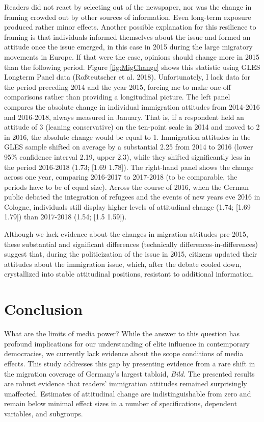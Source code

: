 \documentclass[
  12pt,
]{article}
\begin{document}
Readers did not react by selecting out of the newspaper, nor was the change in framing crowded out by other sources of information. Even long-term exposure produced rather minor effects. Another possible explanation for this resilience to framing is that individuals informed themselves about the issue and formed an attitude once the issue emerged, in this case in 2015 during the large migratory movements in Europe. If that were the case, opinions should change more in 2015 than the following period. Figure \ref{fig:MigChange} shows this statistic using GLES Longterm Panel data (Roßteutscher et al. 2018). Unfortunately, I lack data for the period preceding 2014 and the year 2015, forcing me to make one-off comparisons rather than providing a longitudinal picture. The left panel compares the absolute change in individual immigration attitudes from 2014-2016 and 2016-2018, always measured in January. That is, if a respondent held an attitude of 3 (leaning conservative) on the ten-point scale in 2014 and moved to 2 in 2016, the absolute change would be equal to 1. Immigration attitudes in the GLES sample shifted on average by a substantial 2.25 from 2014 to 2016 (lower 95\% confidence interval 2.19, upper 2.3), while they shifted significantly less in the period 2016-2018 (1.73; {[}1.69 1.78{]}). The right-hand panel shows the change across one year, comparing 2016-2017 to 2017-2018 (to be comparable, the periods have to be of equal size). Across the course of 2016, when the German public debated the integration of refugees and the events of new years eve 2016 in Cologne, individuals still display higher levels of attitudinal change (1.74; {[}1.69 1.79{]}) than 2017-2018 (1.54; {[}1.5 1.59{]}).

Although we lack evidence about the changes in migration attitudes pre-2015, these substantial and significant differences (technically differences-in-differences) suggest that, during the politicization of the issue in 2015, citizens updated their attitudes about the immigration issue, which, after the debate cooled down, crystallized into stable attitudinal positions, resistant to additional information.

\hypertarget{conclusion}{%
\section{Conclusion}\label{conclusion}}

What are the limits of media power? While the answer to this question has profound implications for our understanding of elite influence in contemporary democracies, we currently lack evidence about the scope conditions of media effects. This study addresses this gap by presenting evidence from a rare shift in the migration coverage of Germany's largest tabloid, \emph{Bild}. The presented results are robust evidence that readers' immigration attitudes remained surprisingly unaffected. Estimates of attitudinal change are indistinguishable from zero and remain below minimal effect sizes in a number of specifications, dependent variables, and subgroups.
\end{document}

